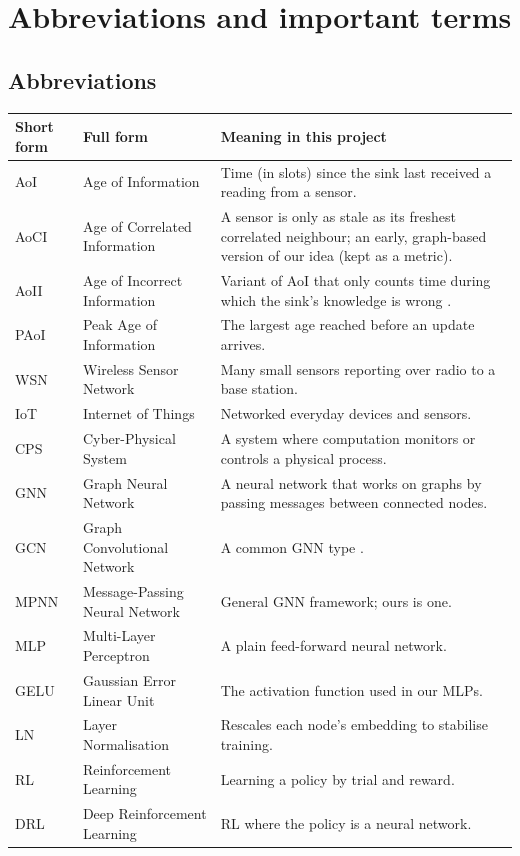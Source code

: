 \section{Abbreviations and important terms}

\subsection{Abbreviations}

{\small
\begin{longtable}{@{}p{2.6cm}p{5.2cm}p{7.6cm}@{}}
\toprule
\textbf{Short form} & \textbf{Full form} & \textbf{Meaning in this project} \\
\midrule
\endhead
AoI & Age of Information & Time (in slots) since the sink last received a reading from a sensor. \\
AoCI & Age of Correlated Information & A sensor is only as stale as its freshest correlated neighbour; an early, graph-based version of our idea (kept as a metric). \\
AoII & Age of Incorrect Information & Variant of AoI that only counts time during which the sink's knowledge is wrong \cite{17}. \\
PAoI & Peak Age of Information & The largest age reached before an update arrives. \\
WSN & Wireless Sensor Network & Many small sensors reporting over radio to a base station. \\
IoT & Internet of Things & Networked everyday devices and sensors. \\
CPS & Cyber-Physical System & A system where computation monitors or controls a physical process. \\
GNN & Graph Neural Network & A neural network that works on graphs by passing messages between connected nodes. \\
GCN & Graph Convolutional Network & A common GNN type \cite{21}. \\
MPNN & Message-Passing Neural Network & General GNN framework; ours is one. \\
MLP & Multi-Layer Perceptron & A plain feed-forward neural network. \\
GELU & Gaussian Error Linear Unit & The activation function used in our MLPs. \\
LN & Layer Normalisation & Rescales each node's embedding to stabilise training. \\
RL & Reinforcement Learning & Learning a policy by trial and reward. \\
DRL & Deep Reinforcement Learning & RL where the policy is a neural network. \\

\end{longtable}}
